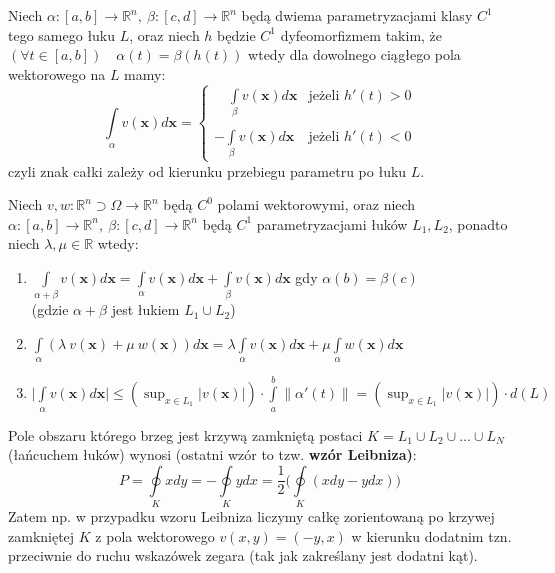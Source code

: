 \begin{tw}
	Niech $\alpha:[a,b]\rightarrow \mathbb{R}^{n},\ \beta:[c,d]\rightarrow \mathbb{R}^{n}$ będą dwiema parametryzacjami klasy $C^{1}$ tego samego łuku $L$, oraz niech $h$ będzie $C^{1}$ dyfeomorfizmem takim, że $(\forall t\in [a,b])\quad\alpha(t)=\beta(h(t))$ wtedy dla dowolnego ciągłego pola wektorowego na $L$ mamy:
	\begin{displaymath}
	\int\limits_{\alpha}v(\mathbf{x})d\mathbf{x}=\left\{\begin{array}{ll}
	\quad \displaystyle\int\limits_{\beta}v(\mathbf{x})d\mathbf{x} & \textrm{jeżeli $h'(t)>0$}
	\\
	\\\displaystyle-\int\limits_{\beta}v(\mathbf{x})d\mathbf{x} & \textrm{jeżeli $h'(t)<0$}
	\end{array} \right.
	\end{displaymath}
	czyli znak całki zależy od kierunku przebiegu parametru po łuku $L$.
\end{tw}

\begin{tw}
	Niech $v,w:\mathbb{R}^{n}\supset\Omega\rightarrow \mathbb{R}^{n}$ będą $C^{0}$ polami wektorowymi, oraz niech $\alpha:[a,b]\rightarrow \mathbb{R}^{n},\ \beta:[c,d]\rightarrow \mathbb{R}^{n}$ będą $C^{1}$ parametryzacjami łuków $L_{1},L_{2}$, ponadto niech $\lambda,\mu\in\mathbb{R}$ wtedy:
	\begin{enumerate}
		\item $\displaystyle\int\limits_{\alpha+\beta}v(\mathbf{x})d\mathbf{x}=\int\limits_{\alpha}v(\mathbf{x})d\mathbf{x}+\int\limits_{\beta}v(\mathbf{x})d\mathbf{x}$ gdy $\alpha(b)=\beta(c)$ \\ {\footnotesize(gdzie $\alpha+\beta$ jest łukiem $L_{1}\cup L_{2}$)}
		\item $\displaystyle\int\limits_{\alpha}(\lambda\ v(\mathbf{x})+\mu\ w(\mathbf{x}))d\mathbf{x}=\lambda\int\limits_{\alpha}v(\mathbf{x})d\mathbf{x}+\mu\int\limits_{\alpha}w(\mathbf{x})d\mathbf{x}$
		\item $\displaystyle\Big|\int\limits_{\alpha}v(\mathbf{x})d\mathbf{x}\Big|\leq(\mathop{sup}_{x\in L_{1}}|v(\mathbf{x})|)\cdot\int\limits_{a}^{b}\|\alpha'(t)\|=(\mathop{sup}_{x\in L_{1}}|v(\mathbf{x})|)\cdot d(L)$
		\\
	\end{enumerate}
\end{tw}

\begin{ft}
	Pole obszaru którego brzeg jest krzywą zamkniętą postaci \linebreak[4]$K=L_1\cup L_2\cup \ldots \cup L_N$ (łańcuchem łuków) wynosi (ostatni wzór to tzw. \textbf{wzór Leibniza)}:
	$$P=\oint\limits_{K}xdy=-\oint\limits_{K}ydx=\frac{1}{2}\Big(\oint\limits_{K}(xdy-ydx)\Big)$$
	Zatem np. w przypadku wzoru Leibniza liczymy całkę zorientowaną po krzywej zamkniętej $K$ z pola wektorowego $v(x,y)=(-y,x)$ w kierunku dodatnim tzn. przeciwnie do ruchu wskazówek zegara (tak jak zakreślany jest dodatni kąt).
\end{ft}

